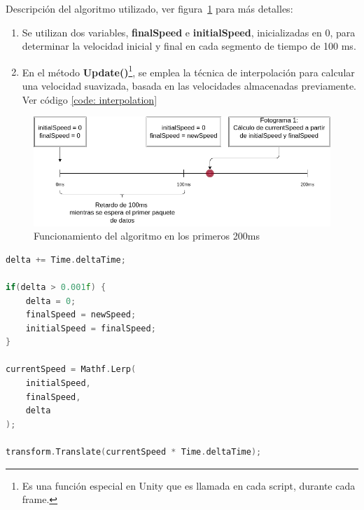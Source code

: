 \vspace{10pt}
Descripción del algoritmo utilizado, ver figura~\ref{fig: interpolation-algorithm} para más detalles:
\begin{enumerate}
    \item Se utilizan dos variables, \textbf{finalSpeed} e \textbf{initialSpeed}, inicializadas en 0, para determinar la velocidad inicial y final en cada segmento de tiempo de 100 ms.
    \item En el método \textbf{Update()}\footnote{Es una función especial en Unity que es llamada en cada script, durante cada frame.}, se emplea la técnica de interpolación para calcular 
    una velocidad suavizada, basada en las velocidades almacenadas previamente. Ver código \ref{code: interpolation}
\end{enumerate} 

\begin{figure}[ht]
    \centering
    \includegraphics[scale=0.4]{images/interpolation-algorithm.png}
    \caption{Funcionamiento del algoritmo en los primeros 200ms}
    \label{fig: interpolation-algorithm}
\end{figure}

\begin{center}
\begin{minipage}{0.8\textwidth}
\begin{lstlisting}[language=c, label={code: interpolation}, caption={Controlador de movimiento}]
delta += Time.deltaTime;
 
if(delta > 0.001f) {
    delta = 0;
    finalSpeed = newSpeed;
    initialSpeed = finalSpeed;
}

currentSpeed = Mathf.Lerp( 
    initialSpeed, 
    finalSpeed, 
    delta
);

transform.Translate(currentSpeed * Time.deltaTime);
\end{lstlisting}
\end{minipage}
\end{center}



